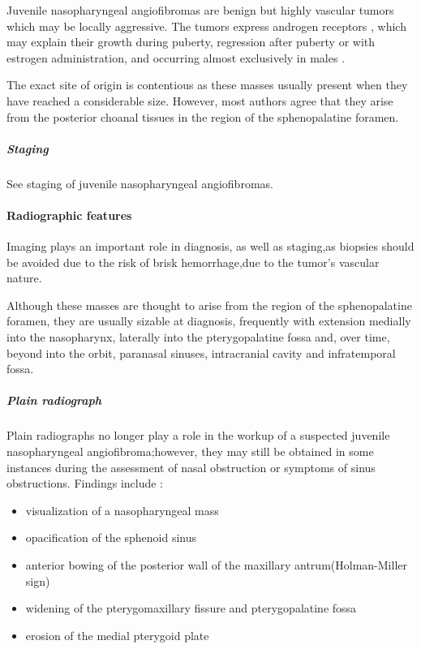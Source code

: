 Juvenile nasopharyngeal angiofibromas are benign but highly vascular tumors which may be locally aggressive. The tumors express androgen receptors , which may explain their growth during puberty, regression after puberty or with estrogen administration, and occurring almost exclusively in males .

The exact site of origin is contentious as these masses usually present when they have reached a considerable size. However, most authors agree that they arise from the posterior choanal tissues in the region of the sphenopalatine foramen.

\subparagraph{Staging}

See staging of juvenile nasopharyngeal angiofibromas.

\paragraph{Radiographic features}

Imaging plays an important role in diagnosis, as well as staging,as biopsies should be avoided due to the risk of brisk hemorrhage,due to the tumor's vascular nature.

Although these masses are thought to arise from the region of the sphenopalatine foramen, they are usually sizable at diagnosis, frequently with extension medially into the nasopharynx, laterally into the pterygopalatine fossa and, over time, beyond into the orbit, paranasal sinuses, intracranial cavity and infratemporal fossa.

\subparagraph{Plain radiograph}

Plain radiographs no longer play a role in the workup of a suspected juvenile nasopharyngeal angiofibroma;however, they may still be obtained in some instances during the assessment of nasal obstruction or symptoms of sinus obstructions. Findings include :

\begin{itemize}
	\item
	visualization of a nasopharyngeal mass
	\item
	opacification of the sphenoid sinus
	\item
	anterior bowing of the posterior wall of the maxillary antrum(Holman-Miller sign)
	\item
	widening of the pterygomaxillary fissure and pterygopalatine fossa
	\item
	erosion of the medial pterygoid plate
\end{itemize}

